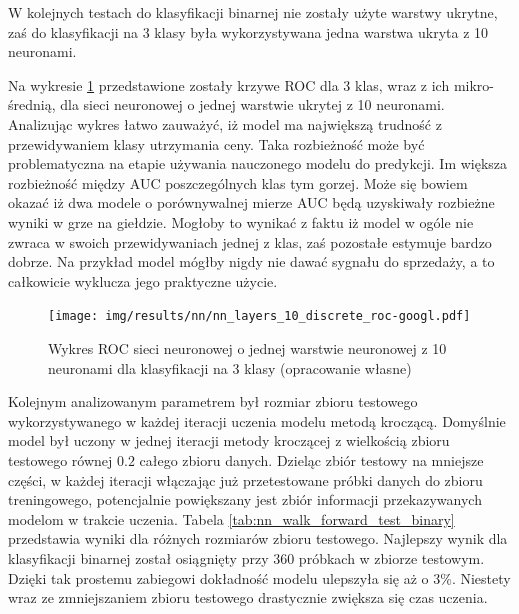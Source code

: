\documentclass[a4paper, twoside, 11pt, openright]{article}
\begin{document}
W kolejnych testach do klasyfikacji binarnej nie zostały użyte warstwy ukrytne, zaś do klasyfikacji na 3 klasy była wykorzystywana jedna warstwa ukryta z 10 neuronami.

\bigskip

Na wykresie \ref{img:nn_layers_discrete} przedstawione zostały krzywe ROC dla 3 klas, wraz z ich mikro-średnią, dla sieci neuronowej o jednej warstwie ukrytej z 10 neuronami. Analizując wykres łatwo zauważyć, iż model ma największą trudność z przewidywaniem klasy utrzymania ceny. Taka rozbieżność może być problematyczna na etapie używania nauczonego modelu do predykcji. Im większa rozbieżność między AUC poszczególnych klas tym gorzej. Może się bowiem okazać iż dwa modele o porównywalnej mierze AUC będą uzyskiwały rozbieżne wyniki w grze na giełdzie. Mogłoby to wynikać z faktu iż model w ogóle nie zwraca w swoich przewidywaniach jednej z klas, zaś pozostałe estymuje bardzo dobrze. Na przykład model mógłby nigdy nie dawać sygnału do sprzedaży, a to całkowicie wyklucza jego praktyczne użycie. 


\begin{figure}[H]
\centering \texttt{[image: img/results/nn/nn\_layers\_10\_discrete\_roc-googl.pdf]}
\caption{Wykres ROC sieci neuronowej o jednej warstwie neuronowej z 10 neuronami dla klasyfikacji na 3 klasy (opracowanie własne)}
\label{img:nn_layers_discrete}
\end{figure}

\bigskip

Kolejnym analizowanym parametrem był rozmiar zbioru testowego wykorzystywanego w każdej iteracji uczenia modelu metodą kroczącą. Domyślnie model był uczony w jednej iteracji metody kroczącej z wielkością zbioru testowego równej $0.2$ całego zbioru danych. Dzieląc zbiór testowy na mniejsze części, w każdej iteracji włączając już przetestowane próbki danych do zbioru treningowego, potencjalnie powiększany jest zbiór informacji przekazywanych modelom w trakcie uczenia. Tabela \ref{tab:nn_walk_forward_test_binary} przedstawia wyniki dla różnych rozmiarów zbioru testowego. Najlepszy wynik dla klasyfikacji binarnej został osiągnięty przy 360 próbkach w zbiorze testowym. Dzięki tak prostemu zabiegowi dokładność modelu ulepszyła się aż o 3\%. Niestety wraz ze zmniejszaniem zbioru testowego drastycznie zwiększa się czas uczenia. 
\end{document}
